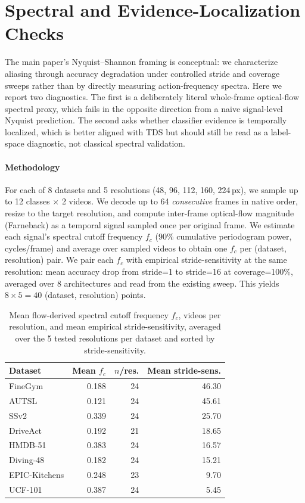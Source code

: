 \documentclass[a4paper, 10pt, conference, onecolumn]{ieeeconf}
\newcommand{\tabtight}{\setlength{\tabcolsep}{3.5pt}\renewcommand{\arraystretch}{1.12}}
\newcommand{\TDS}{\textsc{TDS}}
\begin{document}
\section{Spectral and Evidence-Localization Checks}
\label{sec:sup_nyquist}

The main paper's Nyquist--Shannon framing is conceptual: we characterize aliasing through accuracy degradation under controlled stride and coverage sweeps rather than by directly measuring action-frequency spectra. Here we report two diagnostics. The first is a deliberately literal whole-frame optical-flow spectral proxy, which fails in the opposite direction from a naive signal-level Nyquist prediction. The second asks whether classifier evidence is temporally localized, which is better aligned with \TDS{} but should still be read as a label-space diagnostic, not classical spectral validation.

\paragraph{Methodology} For each of 8 datasets and 5 resolutions (48, 96, 112, 160, 224\,px), we sample up to 12 classes $\times$ 2 videos. We decode up to 64 \emph{consecutive} frames in native order, resize to the target resolution, and compute inter-frame optical-flow magnitude (Farneback) as a temporal signal sampled once per original frame. We estimate each signal's spectral cutoff frequency $f_c$ (90\% cumulative periodogram power, cycles/frame) and average over sampled videos to obtain one $f_c$ per (dataset, resolution) pair. We pair each $f_c$ with empirical stride-sensitivity at the same resolution: mean accuracy drop from stride=1 to stride=16 at coverage=100\%, averaged over 8 architectures and read from the existing sweep. This yields $8\times5=40$ (dataset, resolution) points.

\begin{table}[!htbp]
\centering
\caption{Mean flow-derived spectral cutoff frequency $f_c$, videos per resolution, and mean empirical stride-sensitivity, averaged over the 5 tested resolutions per dataset and sorted by stride-sensitivity.}
\label{tab:nyquist_v2}
\scriptsize\tabtight
\begin{tabular}{l r r r}
\toprule
Dataset & Mean $f_c$ & $n$/res. & Mean stride-sens. \\
\midrule
FineGym       & 0.188 & 24 & 46.30 \\
AUTSL         & 0.121 & 24 & 45.61 \\
SSv2          & 0.339 & 24 & 25.70 \\
DriveAct      & 0.192 & 21 & 18.65 \\
HMDB-51       & 0.383 & 24 & 16.57 \\
Diving-48     & 0.182 & 24 & 15.21 \\
EPIC-Kitchens & 0.248 & 23 &  9.70 \\
UCF-101       & 0.387 & 24 &  5.45 \\
\bottomrule
\end{tabular}
\end{table}
\end{document}
